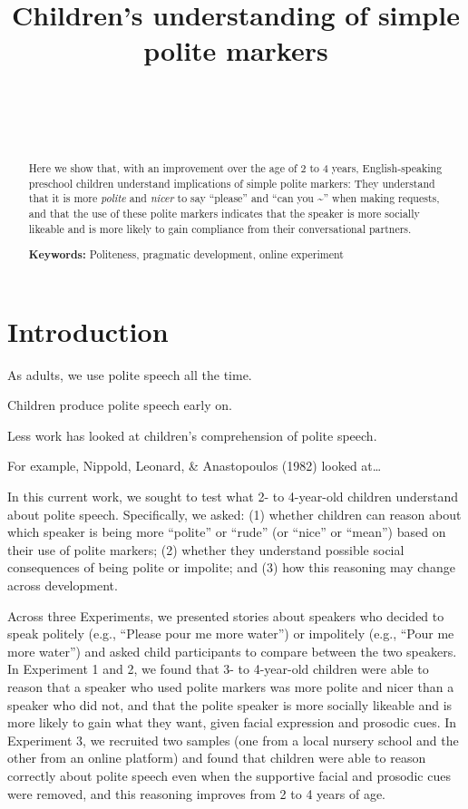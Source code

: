 \documentclass[10pt, letterpaper]{article}
\title{Children's understanding of simple polite markers}
\author{{\large \bf } \\ \texttt{} \\  \\}
\begin{document}
\maketitle

\begin{abstract}
Here we show that, with an improvement over the age of 2 to 4 years,
English-speaking preschool children understand implications of simple
polite markers: They understand that it is more \emph{polite} and
\emph{nicer} to say ``please'' and ``can you \textasciitilde{}'' when
making requests, and that the use of these polite markers indicates that
the speaker is more socially likeable and is more likely to gain
compliance from their conversational partners.

\textbf{Keywords:}
Politeness, pragmatic development, online experiment
\end{abstract}

\section{Introduction}\label{introduction}

As adults, we use polite speech all the time.

Children produce polite speech early on.

Less work has looked at children's comprehension of polite speech.

For example, Nippold, Leonard, \& Anastopoulos (1982) looked at\ldots{}

In this current work, we sought to test what 2- to 4-year-old children
understand about polite speech. Specifically, we asked: (1) whether
children can reason about which speaker is being more ``polite'' or
``rude'' (or ``nice'' or ``mean'') based on their use of polite markers;
(2) whether they understand possible social consequences of being polite
or impolite; and (3) how this reasoning may change across development.

Across three Experiments, we presented stories about speakers who
decided to speak politely (e.g., ``Please pour me more water'') or
impolitely (e.g., ``Pour me more water'') and asked child participants
to compare between the two speakers. In Experiment 1 and 2, we found
that 3- to 4-year-old children were able to reason that a speaker who
used polite markers was more polite and nicer than a speaker who did
not, and that the polite speaker is more socially likeable and is more
likely to gain what they want, given facial expression and prosodic
cues. In Experiment 3, we recruited two samples (one from a local
nursery school and the other from an online platform) and found that
children were able to reason correctly about polite speech even when the
supportive facial and prosodic cues were removed, and this reasoning
improves from 2 to 4 years of age.
\end{document}

